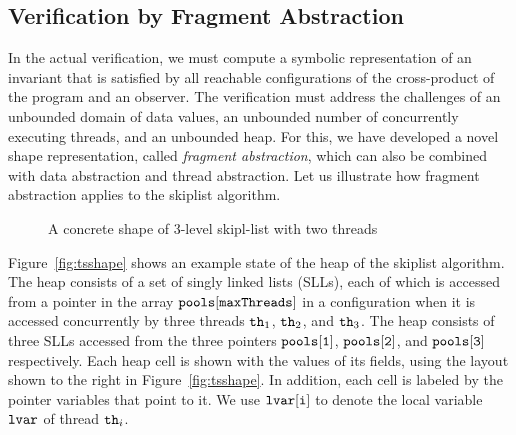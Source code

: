\subsection{Verification by Fragment Abstraction}

In the actual verification, we must compute a symbolic representation
of an invariant that is satisfied by all reachable configurations of
the cross-product of the program  and an observer.
The verification must address the challenges of an unbounded domain of
data values, an unbounded number of concurrently executing threads, and an
unbounded heap.
For this, we have developed a novel shape representation, called
{\em fragment abstraction}, which can also be combined with
data abstraction and thread abstraction.
Let us illustrate how fragment abstraction applies to the skiplist
algorithm.
\begin{figure}
\center  
   
 \caption{A concrete shape of 3-level skipl-list with two threads}
\label{sl-shape}
\end{figure}


Figure~\ref{fig:tsshape} shows an  example state of the heap of the
skiplist algorithm.
The heap consists of a set of singly linked lists (SLLs), each of which
is accessed from a pointer in the array ${\tt pools[maxThreads]}$
in a configuration when %
it is accessed concurrently by three threads ${\tt th}_1$, ${\tt th}_2$, and ${\tt th}_3$. The heap consists of three SLLs accessed from the three pointers $\tt pools[1]$, $\tt pools[2]$, and $\tt pools[3]$ respectively. Each heap cell is
shown with the values of its fields, using the layout shown to the right in
Figure~\ref{fig:tsshape}.
In addition, each cell is labeled by the
pointer variables that point to it. We use ${\tt lvar[i]}$ to denote the local
variable ${\tt lvar}$ of thread ${\tt th}_i$.

